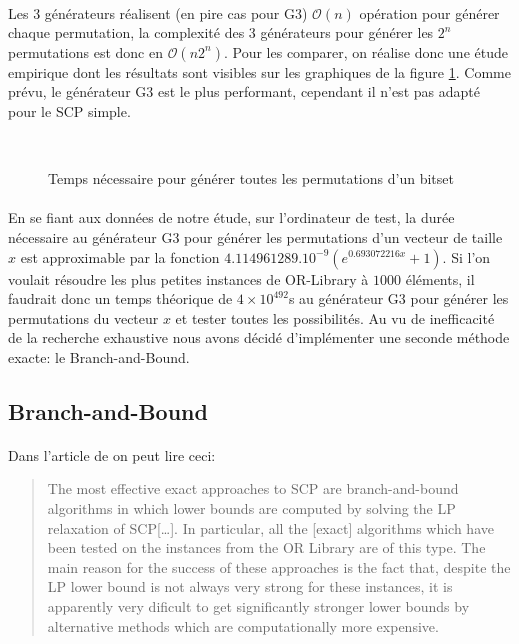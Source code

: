 \documentclass[12pt,letterpaper,twoside]{article}
\begin{document}
			\paragraph*{}
				Les 3 générateurs réalisent (en pire cas pour G3) \(\mathcal{O}(n)\) opération pour générer chaque permutation, la complexité des 3 générateurs pour générer les \(2^n\) permutations est donc en \(\mathcal{O}(n2^n)\). Pour les comparer, on réalise donc une étude empirique dont les résultats sont visibles sur les graphiques de la figure \ref{figure:plots/permutations_generators_time}. Comme prévu, le générateur G3 est le plus performant, cependant il n'est pas adapté pour le SCP simple.
			\begin{figure}[H]
				\centering
				\\
				\caption{Temps nécessaire pour générer toutes les permutations d'un bitset}
				\label{figure:plots/permutations_generators_time}
			\end{figure}
			\paragraph*{}
				En se fiant aux données de notre étude, sur l'ordinateur de test, la durée nécessaire au générateur G3 pour générer les permutations d'un vecteur de taille \(x\) est approximable par la fonction \(4.114961289.10^{-9}\left(e^{0.693072216x} + 1\right)\). Si l'on voulait résoudre les plus petites instances de OR-Library à \(1000\) éléments, il faudrait donc un temps théorique de \(4 \times 10^{492}\)s au générateur G3 pour générer les permutations du vecteur \(x\) et tester toutes les possibilités. Au vu de inefficacité de la recherche exhaustive nous avons décidé d'implémenter une seconde méthode exacte: le Branch-and-Bound.
		\subsection{Branch-and-Bound}
			\paragraph*{}
				Dans l'article  de \citeauthor{caprara2000algorithms} on peut lire ceci:
				\begin{quote}
					The most effective exact approaches to SCP are branch-and-bound algorithms in which lower bounds are computed by solving the LP relaxation of SCP[\ldots]. In particular, all the [exact] algorithms which have been tested on the instances from the OR Library are of this type. The main reason for the success of these approaches is the fact that, despite the LP lower bound is not always very strong for these instances, it is apparently very dificult to get significantly stronger lower bounds by alternative methods which are computationally more expensive.\cite{caprara2000algorithms}
				\end{quote}
\end{document}
